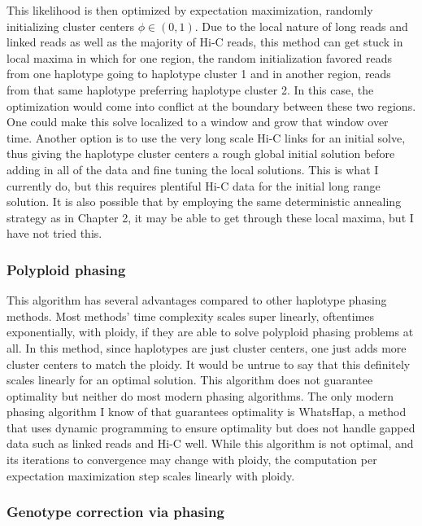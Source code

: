 \par{
This likelihood is then optimized by expectation maximization, randomly initializing cluster centers $\phi \in (0,1)$. Due to the local nature of long reads and linked reads as well as the majority of Hi-C reads, this method can get stuck in local maxima in which for one region, the random initialization favored reads from one haplotype going to haplotype cluster 1 and in another region, reads from that same haplotype preferring haplotype cluster 2. In this case, the optimization would come into conflict at the boundary between these two regions. One could make this solve localized to a window and grow that window over time. Another option is to use the very long scale Hi-C links for an initial solve, thus giving the haplotype cluster centers a rough global initial solution before adding in all of the data and fine tuning the local solutions. This is what I currently do, but this requires plentiful Hi-C data for the initial long range solution. It is also possible that by employing the same deterministic annealing strategy as in Chapter 2, it may be able to get through these local maxima, but I have not tried this.
}
\subsubsection{Polyploid phasing}
\par{
This algorithm has several advantages compared to other haplotype phasing methods. Most methods' time complexity scales super linearly, oftentimes exponentially, with ploidy, if they are able to solve polyploid phasing problems at all. In this method, since haplotypes are just cluster centers, one just adds more cluster centers to match the ploidy. It would be untrue to say that this definitely scales linearly for an optimal solution. This algorithm does not guarantee optimality but neither do most modern phasing algorithms. The only modern phasing algorithm I know of that guarantees optimality is WhatsHap, a method that uses dynamic programming to ensure optimality but does not handle gapped data such as linked reads and Hi-C well\cite{whatshap}. While this algorithm is not optimal, and its iterations to convergence may change with ploidy, the computation per expectation maximization step scales linearly with ploidy.
}
\subsubsection{Genotype correction via phasing}


